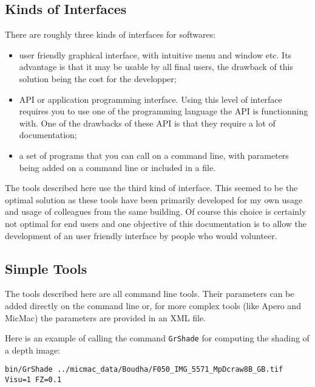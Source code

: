 \subsection{Kinds of Interfaces}
There are roughly three kinds of interfaces for softwares:

\begin{itemize}
   \item user friendly graphical interface, with intuitive menu and window etc.
         Its advantage is that it may be usable by all final users, 
         the drawback of this solution being the cost for the developper;

   \item API or application programming interface. Using this level of interface requires you
         to use one of the programming language the API is functionning with. One of
         the drawbacks of these API is that they require a lot of documentation;

   \item a set of programs that you can call on a command line, with parameters being
         added on a command line or included in a file.
         
\end{itemize}

The tools described here use the third kind of interface. This seemed to be the
optimal solution as these tools have been primarily developed for my own usage and
usage of colleagues from the same building.  Of course this choice is certainly
not optimal for end users and one objective of this documentation is to  allow
the development of an user friendly interface by people who would volunteer.

\subsection{Simple Tools}

The tools described here are all command line tools. Their parameters can be added
directly on the command line or, for more complex tools (like Apero and MicMac) the
parameters are provided in an XML file.

Here is an example of calling the command {\tt GrShade} for computing the shading 
of a depth image:

\begin{verbatim}
bin/GrShade ../micmac_data/Boudha/F050_IMG_5571_MpDcraw8B_GB.tif Visu=1 FZ=0.1
\end{verbatim}


